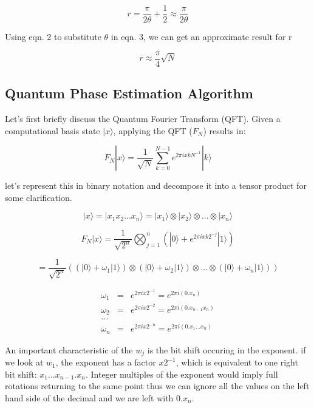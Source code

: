 \documentclass[twocolumn,showpacs,preprintnumbers,amsmath,amssymb]{revtex4}
\begin{document}
		\begin{equation}
			r = \frac{\pi}{2\theta} + \frac{1}{2} \approx \frac{\pi}{2\theta}
		\end{equation}
		
		Using eqn. 2 to substitute $\theta$ in eqn. 3, we can get an approximate result for r
		
		\begin{equation}
			r \approx \frac{\pi}{4}\sqrt{N}
		\end{equation}
		
		
		\subsection{Quantum Phase Estimation Algorithm}
		
		Let's first briefly discuss the Quantum Fourier Transform (QFT). Given a computational basis state $|x\rangle$, applying the QFT ($F_N$) results in:
		
		$$ F_N |x \rangle = \frac{1}{\sqrt{N}} \sum_{k=0}^{N-1} e^{2\pi i x k N^{-1}} |k\rangle $$
		
		let's represent this in binary notation and decompose it into a tensor product for some clarification.
		
		$$|x\rangle = |x_1x_2 ... x_n\rangle =  |x_1\rangle \otimes |x_2\rangle \otimes ... \otimes |x_n\rangle$$
		
		\begin{center}
		$$ F_N |x \rangle = \frac{1}{\sqrt{2^n}} \bigotimes_{j=1}^n (|0\rangle +  e^{2\pi i x k 2^{-j}} |1\rangle)$$
		
		$$= \frac{1}{\sqrt{2^n}} ((|0\rangle + \omega_1|1\rangle)  \otimes(|0\rangle + \omega_2|1\rangle)\otimes ... \otimes(|0\rangle + \omega_n|1\rangle))$$
	     \end{center}
	     
		\begin{eqnarray*}
		\omega_1 &=& e^{2\pi i x 2^{-1}} =  e^{2\pi i (0.x_n)}\\
		\omega_2 &=& e^{2\pi i x 2^{-2}} =  e^{2\pi i (0.x_{n-1}x_n)}\\
		...\\
		\omega_n &=& e^{2\pi i x 2^{-n}} =  e^{2\pi i (0.x_1...x_n)}
		\end{eqnarray*}
	    
		
		An important characteristic of the $w_j$ is the bit shift occuring in the exponent. if we look at $w_1$, the exponent has a factor $x 2^{-1}$, which is equivalent to one right bit shift: $x_1...x_{n-1}.x_n$. Integer multiples of the exponent would imply full rotations returning to the same point thus we can ignore all the values on the left hand side of the decimal and we are left with $0.x_n$. 
		
\end{document}
